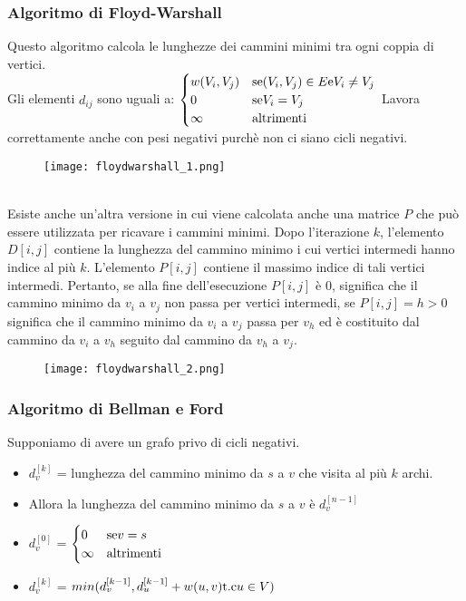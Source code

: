 \subsubsection{Algoritmo di Floyd-Warshall}
Questo algoritmo calcola le lunghezze dei cammini minimi tra ogni coppia di vertici.\\
Gli elementi $d_{ij}$ sono uguali a:
$\begin{cases}
    w(V_i, V_j) & \text{se} \space (V_i, V_j) \in E \space \text{e} V_i \neq V_j\\
    0 & \text{se} \space V_i = V_j\\
    \infty & \text{altrimenti}
\end{cases}$
Lavora correttamente anche con pesi negativi purchè non ci siano cicli negativi.
\\
\begin{figure}[h]
    \texttt{[image: floydwarshall\_1.png]}
\end{figure}
\\Esiste anche un'altra versione in cui viene calcolata anche una matrice $P$ che può essere utilizzata per ricavare i cammini minimi.
Dopo l'iterazione $k$, l'elemento $D[i,j]$ contiene la lunghezza del cammino minimo i cui vertici intermedi hanno indice al più $k$.
L'elemento $P[i,j]$ contiene il massimo indice di tali vertici intermedi.
Pertanto, se alla fine dell'esecuzione $P[i,j]$ è 0, significa che il cammino minimo da $v_i$ a $v_j$ non passa per vertici intermedi, 
se $P[i,j] = h > 0$ significa che il cammino minimo da $v_i$ a $v_j$ passa per $v_h$ 
ed è costituito dal cammino da $v_i$ a $v_h$ seguito dal cammino da $v_h$ a $v_j$.
\begin{figure}[h]
    \texttt{[image: floydwarshall\_2.png]}
\end{figure}
\clearpage

\subsubsection{Algoritmo di Bellman e Ford}
Supponiamo di avere un grafo privo di cicli negativi.\\
\begin{itemize}
    \item $d_{v}^{[k]}$ = lunghezza del cammino minimo da $s$ a $v$ che visita al più $k$ archi.
    \item Allora la lunghezza del cammino minimo da $s$ a $v$ è $d_{v}^{[n-1]}$
    \item $d_{v}^{[0]}$ = $\begin{cases}
        0 & \text{se} \space v = s\\
        \infty & \text{altrimenti}
    \end{cases}$
    \item $d_{v}^{[k]}$ = $min(d_{v}^{[k-1]}, d_{u}^{[k-1]} + w(u, v) \space \text{t.c} \space u \in V)$\\
\end{itemize}


